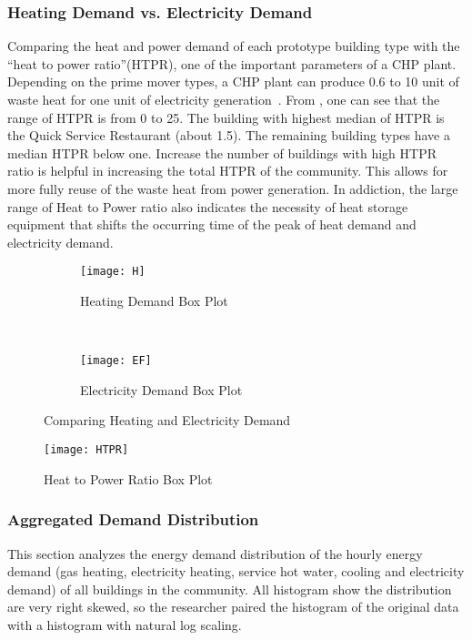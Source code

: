 \subsubsection{Heating Demand vs. Electricity Demand}
Comparing the heat and power demand of each prototype building type
with the ``heat to power ratio''(HTPR), one of the important
parameters of a CHP plant. Depending on the prime mover types, a CHP
plant can produce 0.6 to 10 unit of waste heat for one unit of
electricity generation~\cite{introCHP2010}. From , one
can see that the range of HTPR is from 0 to 25. The building with
highest median of HTPR is the Quick Service Restaurant (about 1.5).
The remaining building types have a median HTPR below one. Increase
the number of buildings with high HTPR ratio is helpful in increasing
the total HTPR of the community. This allows for more fully reuse of
the waste heat from power generation. In addiction, the large range of
Heat to Power ratio also indicates the necessity of heat storage
equipment that shifts the occurring time of the peak of heat demand
and electricity demand.
\begin{figure}[h!]
  \centering
  \begin{subfigure}{0.4\textwidth}
  \centering
  \texttt{[image: H]}
  \caption[Heating Demand Box Plot]{Heating Demand Box
    Plot}
  \label{fig:H}
\end{subfigure}
~
\begin{subfigure}{0.4\textwidth}
  \centering
  \texttt{[image: EF]}
  \caption[Electricity Demand Box Plot]{Electricity Demand Box Plot}
  \label{fig:EF2}
\end{subfigure}
\caption[Comparing Heating and Electricity Demand]{Comparing Heating
  and Electricity Demand}
\end{figure}

\begin{figure}[h!]
  \centering
  \texttt{[image: HTPR]}
  \caption[Heat to Power Ratio Box Plot]{Heat to Power Ratio Box Plot}
  \label{fig:HTPR}
\end{figure}%

\pagebreak
\subsubsection{Aggregated Demand Distribution}
This section analyzes the energy demand distribution of the hourly
energy demand (gas heating, electricity heating, service hot water,
cooling and electricity demand) of all buildings in the community. All
histogram show the distribution are very right skewed, so the researcher paired the
histogram of the original data with a histogram with natural log
scaling.

